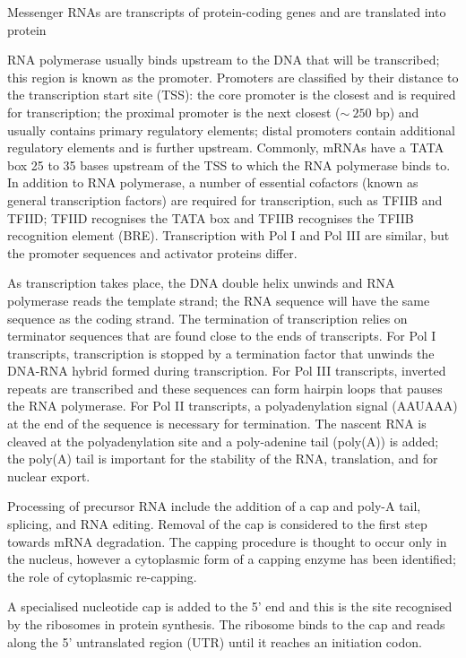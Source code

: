 Messenger RNAs are transcripts of protein-coding genes and are translated into protein

RNA polymerase usually binds upstream to the DNA that will be transcribed; this region is known as the promoter. Promoters are classified by their distance to the transcription start site (TSS): the core promoter is the closest and is required for transcription; the proximal promoter is the next closest ($\sim~250$ bp) and usually contains primary regulatory elements; distal promoters contain additional regulatory elements and is further upstream. Commonly, mRNAs have a TATA box 25 to 35 bases upstream of the TSS to which the RNA polymerase binds to. In addition to RNA polymerase, a number of essential cofactors (known as general transcription factors) are required for transcription, such as TFIIB and TFIID; TFIID recognises the TATA box and TFIIB recognises the TFIIB recognition element (BRE). Transcription with Pol I and Pol III are similar, but the promoter sequences and activator proteins differ.

As transcription takes place, the DNA double helix unwinds and RNA polymerase reads the template strand; the RNA sequence will have the same sequence as the coding strand. The termination of transcription relies on terminator sequences that are found close to the ends of transcripts. For Pol I transcripts, transcription is stopped by a termination factor that unwinds the DNA-RNA hybrid formed during transcription. For Pol III transcripts, inverted repeats are transcribed and these sequences can form hairpin loops that pauses the RNA polymerase. For Pol II transcripts, a polyadenylation signal (AAUAAA) at the end of the sequence is necessary for termination\cite{pmid3479794}. The nascent RNA is cleaved at the polyadenylation site and a poly-adenine tail (poly(A)) is added; the poly(A) tail is important for the stability of the RNA, translation, and for nuclear export.

Processing of precursor RNA include the addition of a cap and poly-A tail, splicing, and RNA editing. Removal of the cap is considered to the first step towards mRNA degradation. The capping procedure is thought to occur only in the nucleus, however a cytoplasmic form of a capping enzyme has been identified; the role of cytoplasmic re-capping.

A specialised nucleotide cap is added to the 5' end and this is the site recognised by the ribosomes in protein synthesis. The ribosome binds to the cap and reads along the 5' untranslated region (UTR) until it reaches an initiation codon.

